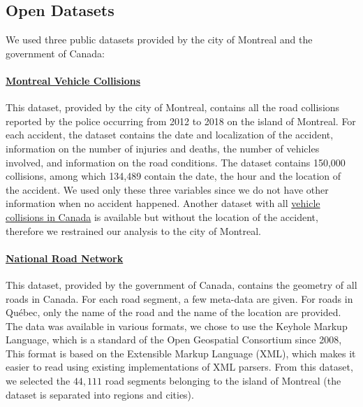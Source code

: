 \documentclass[conference]{IEEEtran}
\begin{document}
\subsection{Open Datasets}
\label{sec:datasets}

We used three public datasets\cite{MVC, NRN, HCD} provided by the city of Montreal and the government of Canada: 

\paragraph{\href{http://donnees.ville.montreal.qc.ca/dataset/collisions-routieres}{Montreal Vehicle Collisions}\cite{MVC}}

This dataset, provided by the city of Montreal, contains all the road
collisions reported by the police occurring from 2012 to 2018 on the island
of Montreal. For each accident, the dataset contains the date and
localization of the accident, information on the number of injuries and
deaths, the number of vehicles involved, and information on the road
conditions. The dataset contains 150,000 collisions, among which 134,489
contain the date, the hour and the location of the accident. We used
only these three variables since we do not have other information when no accident happened.
Another dataset with all \href{https://open.canada.ca/data/en/dataset/1eb9eba7-71d1-4b30-9fb1-30cbdab7e63a}{vehicle collisions in Canada} is available but
without the location of the accident, therefore we restrained our
analysis to the city of Montreal.

\paragraph{\href{https://open.canada.ca/data/en/dataset/3d282116-e556-400c-9306-ca1a3cada77f}{National Road Network}\cite{NRN}}

This dataset, provided by the government of Canada, contains the geometry of
all roads in Canada. For each road segment, a few meta-data are given. For
roads in Québec, only the name of the road and the name of the location are provided. The
data was available in various formats, we chose to use the Keyhole Markup
Language, which is a standard of the Open Geospatial Consortium since 2008\cite{kml}, 
This format is based on the Extensible Markup Language (XML), which makes it
easier to read using existing implementations of XML parsers. From this
dataset, we selected the $44,111$ road segments belonging to the island of
Montreal (the dataset is separated into regions and cities).
\end{document}
